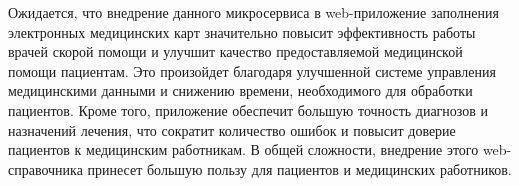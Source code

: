Ожидается, что внедрение данного микросервиса в web-приложение заполнения электронных медицинских карт значительно повысит эффективность работы врачей скорой помощи и улучшит качество предоставляемой медицинской помощи пациентам. Это произойдет благодаря улучшенной системе управления медицинскими данными и снижению времени, необходимого для обработки пациентов. Кроме того, приложение обеспечит большую точность диагнозов и назначений лечения, что сократит количество ошибок и повысит доверие пациентов к медицинским работникам. В общей сложности, внедрение этого web-справочника принесет большую пользу для пациентов и медицинских работников.
